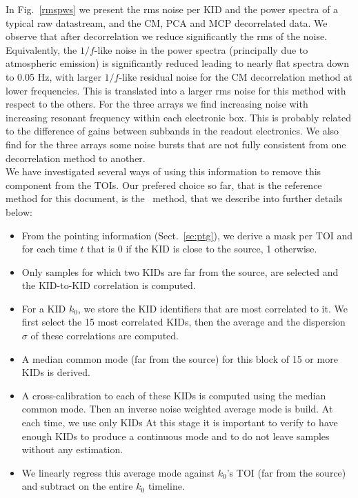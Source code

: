 In Fig.~\ref{rmspws} we present the rms noise per KID and the power spectra of
a typical raw datastream, and the CM, PCA and MCP decorrelated data. We observe that after
decorrelation we reduce significantly the rms of the
noise. Equivalently, the $1/f$-like noise in the power spectra
(principally due to atmospheric emission)
is significantly reduced leading to nearly flat spectra down to 0.05 Hz, with
larger $1/f$-like residual noise for the CM decorrelation method at lower
frequencies. This is translated into a larger rms noise for this method with
respect to the others. For the three arrays we find increasing noise with
increasing resonant frequency within each electronic box. This is probably
related to the difference of gains between subbands in the readout
electronics. We also find for the three arrays some noise bursts that are not
fully consistent from one decorrelation method to another. \\

We have investigated several ways of using this information to remove this
component from the TOIs. Our prefered choice so far, that is the reference
method for this document, is the \cmoneb\ method, that we describe into further
details below:

\begin{itemize}
\item From the pointing information (Sect.~\ref{se:ptg}), we derive a mask per TOI
  and for each time $t$ that is 0 if the KID is close to the source, 1
  otherwise. 
\item Only samples for which two KIDs are far from the source,
   are selected and the KID-to-KID
  correlation is computed.
\item For a KID $k_0$, we store the KID identifiers that are most
  correlated to it. We first select the 15 most correlated KIDs, then 
  the average and the dispersion $\sigma$ of these correlations are
  computed. 
\item A median common mode (far from the source) for this block of 15
  or more KIDs is derived.
\item A cross-calibration to each of these KIDs is computed using the
  median common mode. Then an inverse noise weighted average mode is build. At each time, we use
  only KIDs 
  At this stage it is important to verify to have enough KIDs to produce a
  continuous mode and to do not leave samples without any estimation.
\item We linearly regress this average mode against $k_0$'s TOI (far from the
  source) and subtract on the entire $k_0$ timeline.
\end{itemize}

